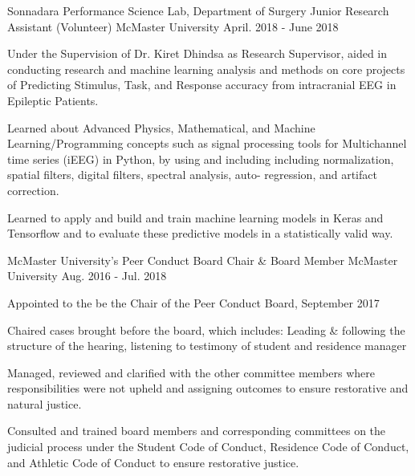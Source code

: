 \begin{cventries}
  \cventry
    {Sonnadara Performance Science Lab, Department of Surgery} %
    {Junior Research Assistant (Volunteer)} %
    {McMaster University} %
    {April. 2018 - June 2018} %
    {
      \begin{cvitems} %
        \item {Under the Supervision of Dr. Kiret Dhindsa as Research Supervisor, aided in conducting research and machine learning analysis and methods on core projects of Predicting Stimulus, Task, and Response accuracy from intracranial EEG in Epileptic Patients.}
        \item {Learned about Advanced Physics, Mathematical, and Machine Learning/Programming concepts such as signal processing tools for \newline Multichannel time series (iEEG) in Python, by using and including including normalization, spatial filters, digital filters, spectral analysis, auto- regression, and artifact correction.}
        \item {Learned to apply and build and train machine learning models in Keras and Tensorflow and to evaluate these predictive models in a statistically valid way.}
      \end{cvitems}
    }
    \cventry
    {McMaster University's Peer Conduct Board} %
    {Chair \& Board Member}
    {McMaster University} %
    {Aug. 2016 - Jul. 2018} %
    {
      \begin{cvitems} %
        \item {Appointed to the be the Chair of the Peer Conduct Board, September 2017}
        \item {Chaired cases brought before the board, which includes: Leading \& following the structure of the hearing, listening to testimony of student and residence manager}
        \item {Managed, reviewed and clarified with the other committee members where responsibilities were not upheld and assigning outcomes to ensure restorative and natural justice.}
        \item {Consulted and trained board members and corresponding committees on the judicial process under the Student Code of Conduct, Residence Code of Conduct, and Athletic Code of Conduct to ensure restorative justice.}
      \end{cvitems}
    }
 



\end{cventries}
